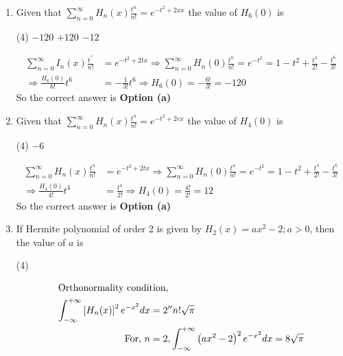 \begin{enumerate}[label=\color{ocre}\textbf{\arabic*.}]
\begin{answer}
\end{answer}
\item Given that $\sum_{n=0}^{\infty} H_{n}(x) \frac{t^{n}}{n !}=e^{-t^{2}+2 x x}$ the value of $H_{6}(0)$ is
 \begin{tasks}(4)
	\task[\textbf{a.}]$-120$
	\task[\textbf{b.}]$+120$
	\task[\textbf{d.}]  $-12$
\end{tasks}
\begin{answer}
	\begin{align*}
	\sum_{n=0}^{\infty} I_{n}(x) \frac{t^{\prime \prime}}{n !}&=e^{-t^{2}+2 t x} \Rightarrow \sum_{n=0}^{\infty} H_{n}(0) \frac{t^{n}}{n !}=e^{-t^{2}}=1-t^{2}+\frac{t^{4}}{2 !}-\frac{t^{6}}{3 !}\\
	\Rightarrow \frac{H_{6}(0)}{6 !} t^{6}&=-\frac{1}{3 !} t^{6} \Rightarrow H_{6}(0)=-\frac{6 !}{3 !}=-120
	\end{align*}
	So the correct answer is \textbf{Option (a)}
\end{answer}
\item Given that $\sum_{n=0}^{\infty} H_{n}(x) \frac{t^{n}}{n !}=e^{-t^{2}+2 e x}$ the value of $H_{4}(0)$ is
 \begin{tasks}(4)
	\task[\textbf{d.}] $-6$
\end{tasks}
\begin{answer}
	\begin{align*}
	\sum_{n=0}^{\infty} H_{n}(x) \frac{t^{n}}{n !}&=e^{-t^{2}+2 t x} \Rightarrow \sum_{n=0}^{\infty} H_{n}(0) \frac{t^{n}}{n !}=e^{-t^{2}}=1-t^{2}+\frac{t^{4}}{2 !}-\frac{t^{6}}{3 !}\\
	\Rightarrow \frac{H_{4}(0)}{4 !} t^{4}&=\frac{t^{4}}{2 !} \Rightarrow H_{4}(0)=\frac{4 !}{2 !}=12
	\end{align*}
	So the correct answer is \textbf{Option (a)}
\end{answer}
\item If Hermite polynomial of order 2 is given by $H_{2}(x)=a x^{2}-2 ; a>0$, then the value of $a$ is
 \begin{tasks}(4)
\end{tasks}
\begin{answer}
	\begin{align*}
	\intertext{Orthonormality condition,}
	\int_{-\infty}^{+\infty}\left[H_{n}(x)\right]^{2} e^{-x^{2}} d x&=2^{\prime \prime} n ! \sqrt{\pi}\\
	\text{For, }n&=2, \int_{-\infty}^{+\infty}\left(a x^{2}-2\right)^{2} e^{-x^{2}} d x=8 \sqrt{\pi}\\

\end{align*}
\end{answer}
\end{enumerate}
